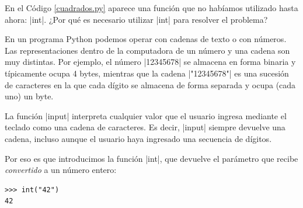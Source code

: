 En el Código \ref{cuadrados.py} aparece una función que no habíamos
utilizado hasta ahora: |int|. ¿Por qué es necesario utilizar |int| para
resolver el problema?

En un programa Python podemos operar con cadenas de texto o con números.  Las
representaciones dentro de la computadora de un número y una cadena son muy
distintas. Por ejemplo, el número |12345678| se almacena en forma binaria y
típicamente ocupa 4 bytes, mientras que la cadena |"12345678"| es una sucesión
de caracteres en la que cada dígito se almacena de forma separada y ocupa (cada
uno) un byte.

La función |input| interpreta cualquier valor que el usuario ingresa mediante
el teclado como una cadena de caracteres. Es decir, |input| siempre devuelve
una cadena, incluso aunque el usuario haya ingresado una secuencia de dígitos.

Por eso es que introducimos la función |int|, que devuelve el parámetro que
recibe {\it convertido} a un número entero:

\begin{lstlisting}[numbers=none]
>>> int("42")
42
\end{lstlisting}


